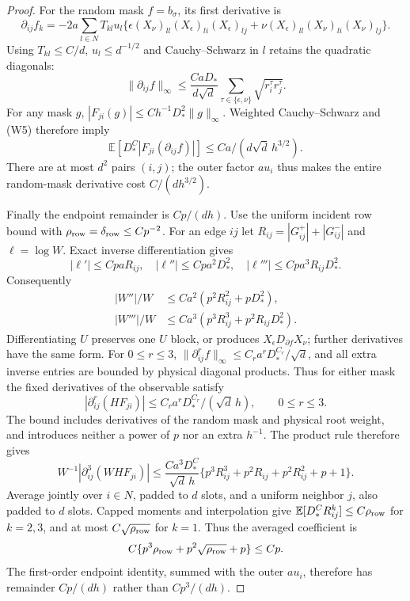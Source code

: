 \documentclass[10pt]{article}
\numberwithin{equation}{section}
\newcommand{\1}{\mathbf1}
\begin{document}
\begin{proof}
For the random mask $f=b_\sigma$, its first derivative is
\[
 \partial_{ij}f_k
 =-2a\sum_{l\in N}T_{kl}u_l
 \{\epsilon(X_\nu)_{ll}(X_\epsilon)_{li}(X_\epsilon)_{lj}
    +\nu(X_\epsilon)_{ll}(X_\nu)_{li}(X_\nu)_{lj}\}.
\]
Using $T_{kl}\le C/d$, $u_l\le d^{-1/2}$ and Cauchy--Schwarz
in $l$ retains the quadratic diagonals:
\[
 \|\partial_{ij}f\|_\infty
 \le\frac{CaD_*}{d\sqrt d}
          \sum_{\tau\in\{\epsilon,\nu\}}\sqrt{r_i^\tau r_j^\tau}.
\]
For any mask $g$, $|F_{ji}(g)|\le Ch^{-1}D_*^2\|g\|_\infty$.
Weighted Cauchy--Schwarz and (W5) therefore imply
\[
 \mathbb E[D_*^C|F_{ji}(\partial_{ij}f)|]
       \le Ca/(d\sqrt d\,h^{3/2}).
\]
There are at most $d^2$ pairs $(i,j)$; the outer factor $a u_i$
thus makes the entire random-mask derivative cost $C/(dh^{3/2})$.

Finally the endpoint remainder is $Cp/(dh)$. Use the uniform incident
row bound with $\rho_{\rm row}=\delta_{\rm row}\le Cp^{-2}$.
For an edge $ij$ let $R_{ij}=|G^+_{ij}|+|G^-_{ij}|$ and
$\ell=\log W$. Exact inverse differentiation gives
\[
 |\ell'|\le CpaR_{ij},\quad
 |\ell''|\le Cpa^2D_*^2,\quad
 |\ell'''|\le Cpa^3R_{ij}D_*^2.
\]
Consequently
\[
 \begin{split}
 |W''|/W&\le Ca^2(p^2R_{ij}^2+pD_*^2),\\
 |W'''|/W&\le Ca^3(p^3R_{ij}^3+p^2R_{ij}D_*^2).
 \end{split}
\]
Differentiating $U$ preserves one $U$ block, or produces
$X_\epsilon D_{\partial f}X_\nu$; further derivatives have the
same form. For $0\le r\le3$,
$\|\partial_{ij}^r f\|_\infty\le C_ra^rD_*^{C_r}/\sqrt d$,
and all extra inverse entries are bounded by physical diagonal products.
Thus for either mask the fixed derivatives of the observable satisfy
\[
 |\partial_{ij}^r(HF_{ji})|
 \le C_r a^r D_*^{C_r}/(\sqrt d\,h),\qquad 0\le r\le3.
\]
The bound includes derivatives of the random mask and physical root
weight, and introduces neither a power of $p$ nor an extra $h^{-1}$. The product rule therefore gives
\[
 W^{-1}|\partial_{ij}^3(WHF_{ji})|
 \le \frac{Ca^3D_*^C}{\sqrt d\,h}
 \{p^3R_{ij}^3+p^2R_{ij}+p^2R_{ij}^2+p+1\}.
\]
Average jointly over $i\in N$, padded to $d$ slots, and a uniform
neighbor $j$, also padded to $d$ slots. Capped moments and
interpolation give $\mathbb E[D_*^C R_{ij}^k]\le C\rho_{\rm row}$
for $k=2,3$, and at most $C\sqrt{\rho_{\rm row}}$ for $k=1$.
Thus the averaged coefficient is
\[
 C\{p^3\rho_{\rm row}+p^2\sqrt{\rho_{\rm row}}+p\}\le Cp.
\]
The first-order endpoint identity, summed with the outer $a u_i$,
therefore has remainder $Cp/(dh)$ rather than $Cp^3/(dh)$.


\end{proof}
\end{document}
